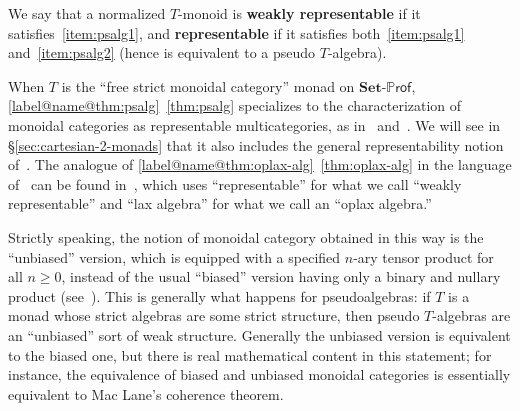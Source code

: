 \documentclass{tac}
\makeatletter
\newcommand{\PROF}[1]{\mathbf{#1}\mbox{-}\mathbb{P}\mathsf{rof}}
\numberwithin{equation}{section}
\def\currthmtype{}
\def\autoref#1{\ref*{label@name@#1}~\ref{#1}}
\def\autoref#1{\ref{label@name@#1}~\ref{#1}}
\let\old@label\label
\def\label#1{%
    {\let\your@currentlabel\@currentlabel%
      \edef\@currentlabel{\currthmtype}%
      \old@label{label@name@#1}}%
    \old@label{#1}}
\makeatother
\begin{document}
We say that a normalized $T$-monoid is \textbf{weakly representable}
if it satisfies~\ref{item:psalg1}, and \textbf{representable} if it
satisfies both~\ref{item:psalg1} and~\ref{item:psalg2} (hence is
equivalent to a pseudo $T$-algebra).

\begin{example}\label{eg:repr-moncat}
  When $T$ is the ``free strict monoidal category'' monad on
  $\PROF{Set}$, \autoref{thm:psalg} specializes to the
  characterization of monoidal categories as representable
  multicategories, as in~\cite{HermidaRepresentable}
  and~\cite[\S3.3]{leinster:higher-opds}. We will see in
  \S\ref{sec:cartesian-2-monads} that it also includes the general
  representability notion of~\cite{HermidaCoherent}. The analogue of
  \autoref{thm:oplax-alg} in the language of~\cite{burroni:t-cats} can
  be found in~\cite{penon:tcats-rep}, which uses ``representable'' for
  what we call ``weakly representable'' and ``lax algebra'' for what
  we call an ``oplax algebra.''
\end{example}

\begin{remark}\label{rmk:bias}
  Strictly speaking, the notion of monoidal category obtained in this
  way is the ``unbiased'' version, which is equipped with a specified
  $n$-ary tensor product for all $n\ge 0$, instead of the usual
  ``biased'' version having only a binary and nullary product
  (see~\cite[\S3.1]{leinster:higher-opds}).  This
  is generally what happens for pseudoalgebras: if $T$ is a monad
  whose strict algebras are some strict structure, then pseudo
  $T$-algebras are an ``unbiased'' sort of weak structure.  Generally
  the unbiased version is equivalent to the biased one, but there is
  real mathematical content in this statement; for instance, the
  equivalence of biased and unbiased monoidal categories is
  essentially equivalent to Mac Lane's coherence theorem.
\end{remark}
\end{document}
